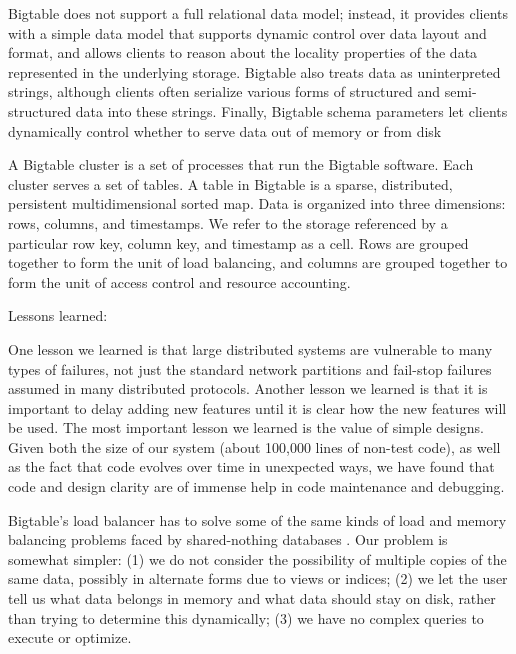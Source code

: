\documentclass[a4paper,twoside]{scrbook}
\begin{document}
Bigtable does not support a full relational data model; instead, it provides clients with a simple data model that supports dynamic control over data layout and format, and allows clients to reason about the locality properties of the data represented in the underlying storage.
Bigtable also treats data as uninterpreted strings, although clients often serialize various forms of structured and semi-structured data into these strings. 
Finally, Bigtable schema  parameters let clients dynamically control whether to serve data out of memory or from disk
\par
A Bigtable cluster is a set of processes that run the Bigtable software. Each cluster serves a set of tables. A table in Bigtable is a sparse, distributed, persistent multidimensional sorted map. Data is organized into three dimensions: rows, columns, and timestamps.
We refer to the storage referenced by a particular row key, column key, and timestamp as a cell. Rows are grouped together to form the unit of load balancing, and columns are grouped together to form the unit of access control and resource accounting.
\par
Lessons learned:\par
One lesson we learned is that large distributed systems are vulnerable to many types of failures, not just the standard network partitions and fail-stop failures assumed in many distributed protocols. 
Another lesson we learned is that it is important to delay adding new features until it is clear how the new features will be used.
The most important lesson we learned is the value of simple designs. Given both the size of our system (about 100,000 lines of non-test code), as well as the fact that code evolves over time in unexpected ways, we have found that code and design clarity are of immense help in code maintenance and debugging.
\par
Bigtable’s load balancer has to solve some of the same kinds of load and memory balancing problems faced by shared-nothing databases . 
Our problem is somewhat simpler: 
(1) we do not consider the possibility of multiple copies of the same data, possibly in alternate forms due to views or indices; 
(2) we let the user tell us what data belongs in memory and what data should stay on disk, rather than trying to determine this dynamically; 
(3) we have no complex queries to execute or optimize.
\end{document}
